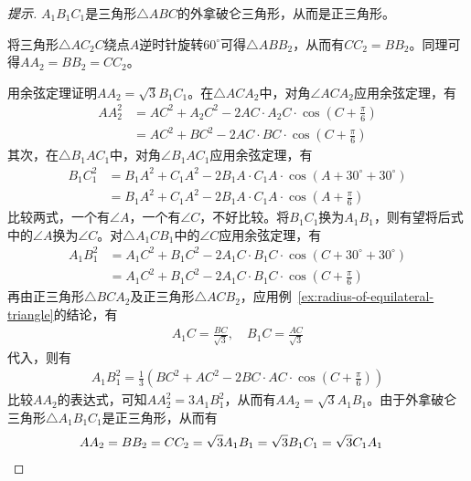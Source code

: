 \begin{example}[南京，1978]
\begin{center}
  \end{center}
\end{example}
\begin{proof}[提示]
  $A_1B_1C_1$是三角形$\triangle ABC$的外拿破仑三角形，从而是正三角形。

  将三角形$\triangle AC_2C$绕点$A$逆时针旋转$60^\circ$可得$\triangle ABB_2$，从而有$CC_2=BB_2$。同理可得$AA_2=BB_2=CC_2$。

  
  用余弦定理证明$AA_2=\sqrt3B_1C_1$。在$\triangle ACA_2$中，对角$\angle ACA_2$应用余弦定理，有
  \begin{align*}
    AA_2^2 &= AC^2 + A_2C^2 - 2AC\cdot A_2C\cdot\cos(C+\frac\pi6)\\
           &= AC^2 + BC^2 - 2AC\cdot BC\cdot\cos(C+\frac\pi6)
  \end{align*}
  其次，在$\triangle B_1AC_1$中，对角$\angle B_1AC_1$应用余弦定理，有
  \begin{align*}
    B_1C_1^2 & = B_1A^2 + C_1A^2 - 2B_1A\cdot C_1A\cdot \cos(A+30^\circ + 30^\circ) \\
             &= B_1A^2 + C_1A^2 - 2B_1A\cdot C_1A\cdot \cos(A+\frac\pi6)
  \end{align*}
  比较两式，一个有$\angle A$，一个有$\angle C$，不好比较。将$B_1C_1$换为$A_1B_1$，则有望将后式中的$\angle A$换为$\angle C$。对$\triangle A_1CB_1$中的$\angle C$应用余弦定理，有
  \begin{align*}
    A_1B_1^2 &= A_1C^2 + B_1C^2 - 2A_1C\cdot B_1C\cdot\cos(C + 30^\circ + 30^\circ)\\
             & = A_1C^2 + B_1C^2 - 2A_1C\cdot B_1C\cdot\cos(C + \frac\pi6)
  \end{align*}
  再由正三角形$\triangle BCA_2$及正三角形$\triangle ACB_2$，应用例~\ref{ex:radius-of-equilateral-triangle}的结论，有
  \begin{align*}
    A_1C = \frac{BC}{\sqrt3},\quad B_1C = \frac{AC}{\sqrt3}
  \end{align*}
  代入，则有
  \begin{align*}
    A_1B_1^2 = \frac13\left(BC^2 + AC^2 - 2 BC\cdot AC\cdot\cos(C + \frac\pi6)\right)
  \end{align*}
  比较$AA_2$的表达式，可知$AA_2^2 = 3A_1B_1^2$，从而有$AA_2=\sqrt3 A_1B_1$。由于外拿破仑三角形$\triangle A_1B_1C_1$是正三角形，从而有
  \begin{align*}
    AA_2=BB_2=CC_2=\sqrt3 A_1B_1 = \sqrt3 B_1C_1 = \sqrt3 C_1A_1 &\qedhere
  \end{align*}
\end{proof}

